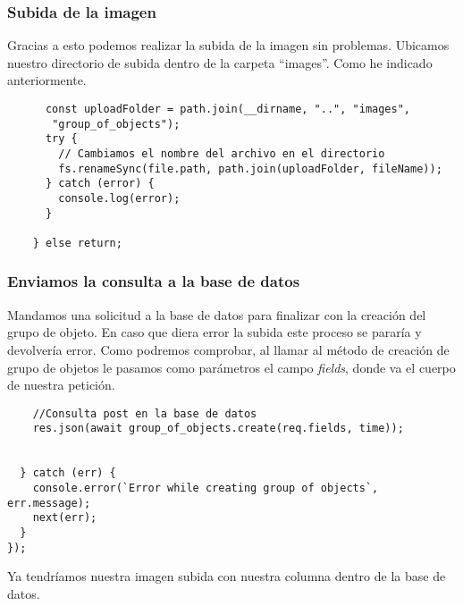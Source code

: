 \subsubsection{Subida de la imagen}
Gracias a esto podemos realizar la subida de la imagen sin problemas. Ubicamos nuestro directorio de subida dentro de la carpeta ``images''. Como he indicado anteriormente.

\begin{verbatim}
      const uploadFolder = path.join(__dirname, "..", "images",
       "group_of_objects");
      try {
        // Cambiamos el nombre del archivo en el directorio
        fs.renameSync(file.path, path.join(uploadFolder, fileName));
      } catch (error) {
        console.log(error);
      }

    } else return;
\end{verbatim}

\subsubsection{Enviamos la consulta a la base de datos}
Mandamos una solicitud a la base de datos para finalizar con la creación del grupo de objeto. En caso que diera error la subida este proceso se pararía y devolvería error. Como podremos comprobar, al llamar al método de creación de grupo de objetos le pasamos como parámetros el campo \textit{fields}, donde va el cuerpo de nuestra petición.

\begin{verbatim}
    //Consulta post en la base de datos
    res.json(await group_of_objects.create(req.fields, time));


  } catch (err) {
    console.error(`Error while creating group of objects`, err.message);
    next(err);
  }
});
\end{verbatim}

Ya tendríamos nuestra imagen subida con nuestra columna dentro de la base de datos.
